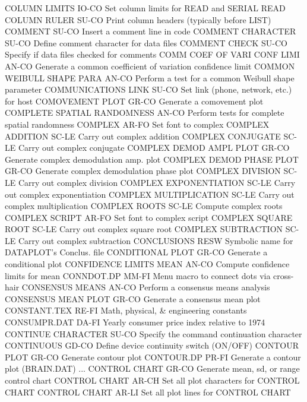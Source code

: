 COLUMN LIMITS               IO-CO Set column limits for READ and SERIAL READ
COLUMN RULER                SU-CO Print column headers (typically before LIST)
COMMENT                     SU-CO Insert a comment line in code
COMMENT CHARACTER           SU-CO Define comment character for data files
COMMENT CHECK               SU-CO Specify if data files checked for comments
COMM COEF OF VARI CONF LIMI AN-CO Generate a common coefficient of variation confidence limit
COMMON WEIBULL SHAPE PARA   AN-CO Perform a test for a common Weibull shape parameter
COMMUNICATIONS LINK         SU-CO Set link (phone, network, etc.) for host
COMOVEMENT PLOT             GR-CO Generate a comovement plot
COMPLETE SPATIAL RANDOMNESS AN-CO Perform tests for complete spatial randomness
COMPLEX                     AR-FO Set font to complex
COMPLEX ADDITION            SC-LE Carry out complex addition
COMPLEX CONJUGATE           SC-LE Carry out complex conjugate
COMPLEX DEMOD AMPL PLOT     GR-CO Generate complex demodulation amp. plot
COMPLEX DEMOD PHASE PLOT    GR-CO Generate complex demodulation phase plot
COMPLEX DIVISION            SC-LE Carry out complex division
COMPLEX EXPONENTIATION      SC-LE Carry out complex exponentiation
COMPLEX MULTIPLICATION      SC-LE Carry out complex multiplication
COMPLEX ROOTS               SC-LE Compute complex roots
COMPLEX SCRIPT              AR-FO Set font to complex script
COMPLEX SQUARE ROOT         SC-LE Carry out complex square root
COMPLEX SUBTRACTION         SC-LE Carry out complex subtraction
CONCLUSIONS                 RESW  Symbolic name for DATAPLOT's Conclus. file
CONDITIONAL PLOT            GR-CO Generate a conditional plot
CONFIDENCE LIMITS MEAN      AN-CO Compute confidence limits for mean
CONNDOT.DP                  MM-FI Menu macro to connect dots via cross-hair
CONSENSUS MEANS             AN-CO Perform a consensus means analysis
CONSENSUS MEAN PLOT         GR-CO Generate a consensus mean plot
CONSTANT.TEX                RE-FI Math, physical, & engineering constants
CONSUMPR.DAT                DA-FI Yearly consumer price index relative to 1974
CONTINUE CHARACTER          SU-CO Specify the command continuation character
CONTINUOUS                  GD-CO Define device continuity switch (ON/OFF)
CONTOUR PLOT                GR-CO Generate contour plot
CONTOUR.DP                  PR-FI Generate a contour plot (BRAIN.DAT)
... CONTROL CHART           GR-CO Generate mean, sd, or range control chart
CONTROL CHART               AR-CH Set all plot characters for CONTROL CHART
CONTROL CHART               AR-LI Set all plot lines for CONTROL CHART
